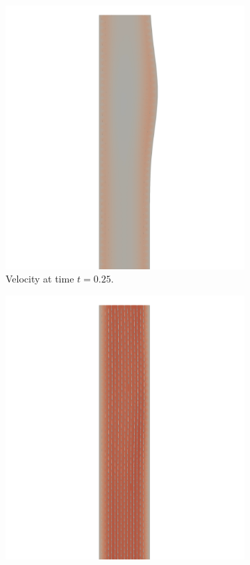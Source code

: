 \documentclass[a4paper,11pt,openright,twoside]{book}
\begin{document}
\begin{figure}[h!]
\begin{subfigure}[b]{0.5\linewidth}
    \includegraphics[width=1.2\linewidth]{images/velocity_30_025.png}
        \centering 
    \caption{Velocity at time $t = 0.25$.} 
    \label{fig2:b} 
    \vspace{4ex}
  \end{subfigure} 
  \begin{subfigure}[b]{0.5\linewidth}
    \centering
    \includegraphics[width=1.2\linewidth]{images/velocity_30_050.png} 

\end{subfigure}
\end{figure}
\end{document}
